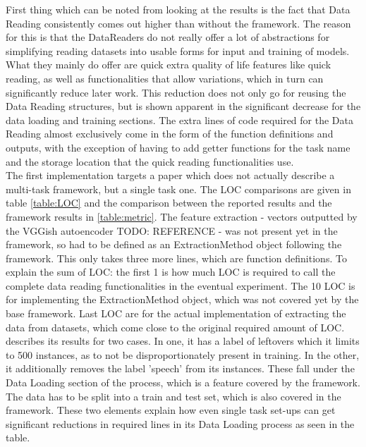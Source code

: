 First thing which can be noted from looking at the results is the fact that Data Reading consistently comes out higher than without the framework. The reason for this is that the DataReaders do not really offer a lot of abstractions for simplifying reading datasets into usable forms for input and training of models. What they mainly do offer are quick extra quality of life features like quick reading, as well as functionalities that allow variations, which in turn can significantly reduce later work. This reduction does not only go for reusing the Data Reading structures, but is shown apparent in the significant decrease for the data loading and training sections. The extra lines of code required for the Data Reading almost exclusively come in the form of the function definitions and outputs, with the exception of having to add getter functions for the task name and the storage location that the quick reading functionalities use. \\ 

\textbf{\cite{park2020augmenting}} The first implementation \cite{park2020augmenting} targets a paper which does not actually describe a multi-task framework, but a single task one. The LOC comparisons are given in table \ref{table:LOC} and the comparison between the reported results and the framework results in \ref{table:metric}. The feature extraction - vectors outputted by the VGGish autoencoder TODO: REFERENCE - was not present yet in the framework, so had to be defined as an ExtractionMethod object following the framework. This only takes three more lines, which are function definitions. To explain the sum of LOC: the first 1 is how much LOC is required to call the complete data reading functionalities in the eventual experiment. The 10 LOC is for implementing the ExtractionMethod object, which was not covered yet by the base framework. Last LOC are for the actual implementation of extracting the data from datasets, which come close to the original required amount of LOC.\\

\citep{park2020augmenting} describes its results for two cases. In one, it has a label of leftovers which it limits to 500 instances, as to not be disproportionately present in training. In the other, it additionally removes the label 'speech' from its instances. These fall under the Data Loading section of the process, which is a feature covered by the framework. The data has to be split into a train and test set, which is also covered in the framework. These two elements explain how even single task set-ups can get significant reductions in required lines in its Data Loading process as seen in the table.  \\

